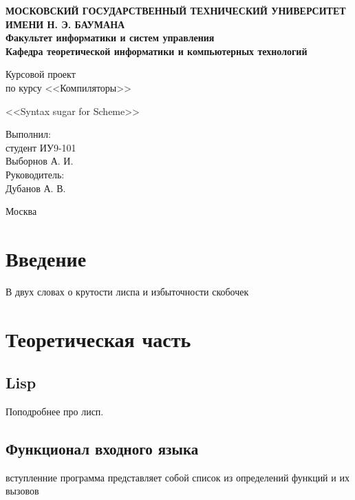 \documentclass[12pt,a4paper,oneside]{extarticle}
\begin{document}
\pgfplotsset{compat=1.8}

\thispagestyle{empty}
\newpage
{
\centering


\textbf{
МОСКОВСКИЙ ГОСУДАРСТВЕННЫЙ ТЕХНИЧЕСКИЙ УНИВЕРСИТЕТ ИМЕНИ Н. Э. БАУМАНА \\
Факультет информатики и систем управления \\
Кафедра теоретической информатики и компьютерных технологий}
\bigskip
\bigskip
\bigskip
\bigskip
\bigskip
\bigskip
\bigskip

\vfill


Курсовой проект \\
по курсу <<Компиляторы>>

\bigskip

{\large <<Syntax sugar for Scheme>>}
\bigskip

\vfill



\hfill\parbox{4cm} {
Выполнил:\\
студент ИУ9-101 \hfill \\
Выборнов А. И.\hfill \medskip\\
Руководитель:\\
Дубанов А. В.\hfill
}


\vspace{\fill}

Москва \number\year
\clearpage
}


\tableofcontents

\clearpage


\section*{Введение}
    В двух словах о крутости лиспа и избыточности скобочек
\clearpage

\section{Теоретическая часть}
    \subsection{Lisp}
        Поподробнее про лисп.
    \subsection{Функционал входного языка}
        вступленние
        программа представляет собой список из определений функций и их вызовов
\end{document}
